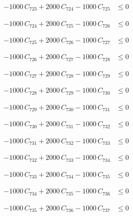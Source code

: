 \documentclass[a4paper,11pt]{article}
\begin{document}
\begin{align}
-1000\,C_{723} + 2000\,C_{724} - 1000\,C_{725} &\leq 0 \nonumber
\end{align}

\begin{align}
-1000\,C_{724} + 2000\,C_{725} - 1000\,C_{726} &\leq 0 \nonumber
\end{align}

\begin{align}
-1000\,C_{725} + 2000\,C_{726} - 1000\,C_{727} &\leq 0 \nonumber
\end{align}

\begin{align}
-1000\,C_{726} + 2000\,C_{727} - 1000\,C_{728} &\leq 0 \nonumber
\end{align}

\begin{align}
-1000\,C_{727} + 2000\,C_{728} - 1000\,C_{729} &\leq 0 \nonumber
\end{align}

\begin{align}
-1000\,C_{728} + 2000\,C_{729} - 1000\,C_{730} &\leq 0 \nonumber
\end{align}

\begin{align}
-1000\,C_{729} + 2000\,C_{730} - 1000\,C_{731} &\leq 0 \nonumber
\end{align}

\begin{align}
-1000\,C_{730} + 2000\,C_{731} - 1000\,C_{732} &\leq 0 \nonumber
\end{align}

\begin{align}
-1000\,C_{731} + 2000\,C_{732} - 1000\,C_{733} &\leq 0 \nonumber
\end{align}

\begin{align}
-1000\,C_{732} + 2000\,C_{733} - 1000\,C_{734} &\leq 0 \nonumber
\end{align}

\begin{align}
-1000\,C_{733} + 2000\,C_{734} - 1000\,C_{735} &\leq 0 \nonumber
\end{align}

\begin{align}
-1000\,C_{734} + 2000\,C_{735} - 1000\,C_{736} &\leq 0 \nonumber
\end{align}

\begin{align}
-1000\,C_{735} + 2000\,C_{736} - 1000\,C_{737} &\leq 0 \nonumber
\end{align}
\end{document}
